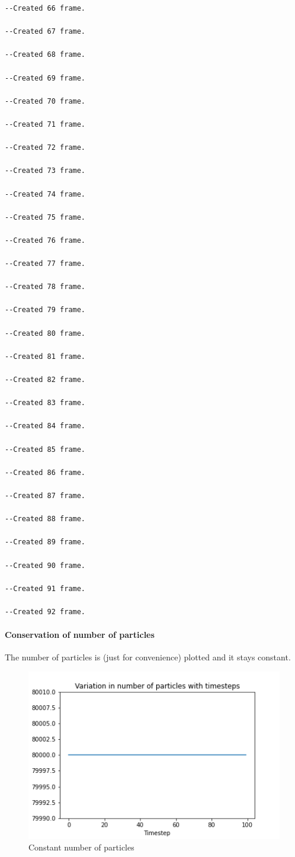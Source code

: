 \documentclass[
]{article}
\begin{document}
\begin{verbatim}
--Created 66 frame.

--Created 67 frame.

--Created 68 frame.

--Created 69 frame.

--Created 70 frame.

--Created 71 frame.

--Created 72 frame.

--Created 73 frame.

--Created 74 frame.

--Created 75 frame.

--Created 76 frame.

--Created 77 frame.

--Created 78 frame.

--Created 79 frame.

--Created 80 frame.

--Created 81 frame.

--Created 82 frame.

--Created 83 frame.

--Created 84 frame.

--Created 85 frame.

--Created 86 frame.

--Created 87 frame.

--Created 88 frame.

--Created 89 frame.

--Created 90 frame.

--Created 91 frame.

--Created 92 frame.
\end{verbatim}

\hypertarget{conservation-of-number-of-particles}{%
\paragraph{Conservation of number of
particles}\label{conservation-of-number-of-particles}}

The number of particles is (just for convenience) plotted and it stays
constant.

\begin{figure}
\centering
\includegraphics{Assets/number_particles.png}
\caption{Constant number of particles}
\end{figure}
\end{document}
